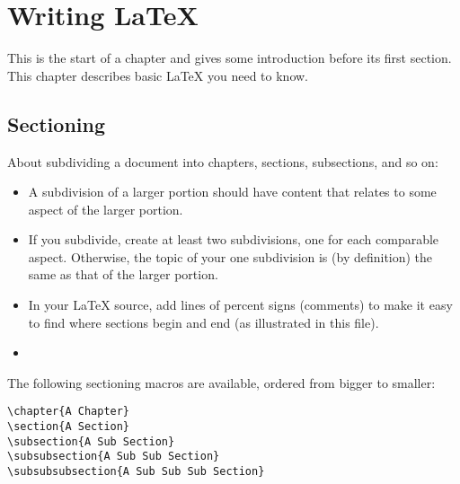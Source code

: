 
\chapter{Writing \LaTeX}

This is the start of a chapter and gives some introduction before its first section.  This chapter describes basic \LaTeX{} you need to know.

\section{Sectioning}
\label{sec:sectioning}

About subdividing a document into chapters, sections, subsections, and so on:

\begin{itemize}
\item A subdivision of a larger portion should have content that relates to some aspect of the larger portion. 
\item  If you subdivide, create at least two subdivisions, one for each comparable aspect. Otherwise, the topic of your one subdivision is (by definition) the same as that of the larger portion.
\item In your \LaTeX{} source, add lines of percent signs (comments) to make it easy to find where sections begin and end (as illustrated in this file).
\item {}
\end{itemize}


The following sectioning macros are available, ordered from bigger to smaller:

\begin{verbatim}
\chapter{A Chapter}
\section{A Section}
\subsection{A Sub Section}
\subsubsection{A Sub Sub Section}
\subsubsubsection{A Sub Sub Sub Section}
\end{verbatim}

